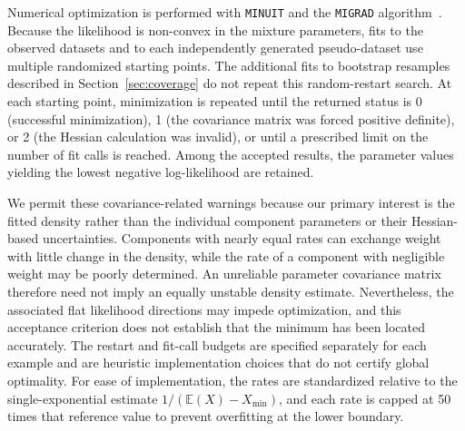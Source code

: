 \documentclass[a4paper,11pt]{article}
\begin{document}
Numerical optimization is performed with \texttt{MINUIT} and the \texttt{MIGRAD} algorithm~\cite{Minuit2}. Because the likelihood is non-convex in the mixture parameters, fits to the observed datasets and to each independently generated pseudo-dataset use multiple randomized starting points. The additional fits to bootstrap resamples described in Section~\ref{sec:coverage} do not repeat this random-restart search. At each starting point, minimization is repeated until the returned status is 0 (successful minimization), 1 (the covariance matrix was forced positive definite), or 2 (the Hessian calculation was invalid), or until a prescribed limit on the number of fit calls is reached. Among the accepted results, the parameter values yielding the lowest negative log-likelihood are retained.

We permit these covariance-related warnings because our primary interest is the fitted density rather than the individual component parameters or their Hessian-based uncertainties. Components with nearly equal rates can exchange weight with little change in the density, while the rate of a component with negligible weight may be poorly determined. An unreliable parameter covariance matrix therefore need not imply an equally unstable density estimate. Nevertheless, the associated flat likelihood directions may impede optimization, and this acceptance criterion does not establish that the minimum has been located accurately. The restart and fit-call budgets are specified separately for each example and are heuristic implementation choices that do not certify global optimality. For ease of implementation, the rates are standardized relative to the single-exponential estimate $1/(\mathbb{E}(X)-X_{\min})$, and each rate is capped at 50 times that reference value to prevent overfitting at the lower 
boundary.
\end{document}
